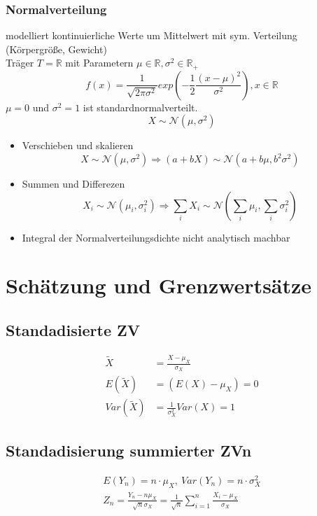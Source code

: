 \documentclass[10pt,a4paper,landscape]{article}
\begin{document}
\begin{multicols}{4}
\subsubsection{Normalverteilung}
modelliert kontinuierliche Werte um Mittelwert mit sym. Verteilung (Körpergröße, Gewicht) \\
Träger $T=\mathbb{R}$ mit Parametern $\mu \in \mathbb{R}, \sigma^2 \in \mathbb{R}_+$
\[
f(x)=\frac{1}{\sqrt{2 \pi \sigma^2}}exp\left(-\frac{1}{2}\frac{(x-\mu)^2}{\sigma^2}\right), x\in \mathbb{R}
\]
$\mu = 0$ und $\sigma^2 = 1$ ist standardnormalverteilt.
\[
X \sim \mathcal{N}(\mu , \sigma^2)
\]

\begin{itemize}
\item Verschieben und skalieren
\[
X \sim \mathcal{N}(\mu , \sigma^2) \Rightarrow (a+bX) \sim \mathcal{N}(a+b\mu ,b^2 \sigma^2)
\]
\item Summen und Differezen
\[
X_i \sim \mathcal{N}(\mu_i , \sigma^2_i) \Rightarrow \sum_i X_i \sim \mathcal{N}(\sum_i \mu_i , \sum_i \sigma^2_i)
\]
\item Integral der Normalverteilungsdichte nicht analytisch machbar
\end{itemize}


\section{Schätzung und Grenzwertsätze}

\subsection{Standadisierte ZV}
\begin{align*}
\tilde{X} &= \frac{X- \mu_X}{\sigma_X} \\
E(\tilde{X}) &= (E(X)-\mu_X)=0 \\
Var(\tilde{X})&=\frac{1}{\sigma^2_X}Var(X) = 1
\end{align*}

\subsection{Standadisierung summierter ZVn}
\begin{align*}
E(Y_n) = n \cdot \mu_X, ~ Var(Y_n)= n \cdot \sigma_X^2 \\
Z_n = \frac{Y_n - n\mu_X}{\sqrt{n}\sigma_X}=\frac{1}{\sqrt{n}}\sum_{i=1}^n \frac{X_i-\mu_X}{\sigma_X}
\end{align*}


\end{multicols}
\end{document}

